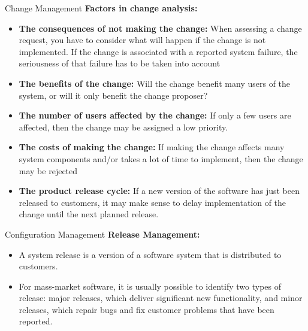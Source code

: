 \documentclass{beamer}
\begin{document}
\begin{frame}{Change Management}
	\textbf{Factors in change analysis:}
	\begin{itemize}
		\item \textbf{The consequences of not making the change:} When assessing a change request, you have to consider 
		what will happen if the change is not implemented. If the change is associated with a reported system 
		failure, the seriousness of that failure has to be taken into account
		\item \textbf{The benefits of the change:} Will the change benefit many users of the system, or will it only benefit the 
		change proposer?
		\item \textbf{The number of users affected by the change:} If only a few users are affected, then the change may be 
		assigned a low priority.
		\item \textbf{The costs of making the change:} If making the change affects many system components and/or takes a 
		lot of time to implement, then the change may be rejected
		\item \textbf{The product release cycle:} If a new version of the software has just been released to customers, it may 
		make sense to delay implementation of the change until the next planned release.

	\end{itemize}
\end{frame}
\begin{frame}{Configuration Management}
	\textbf{Release Management:}
	\begin{itemize}
		\item A system release is a version of a software system that is distributed to customers.
		\item  For mass-market 
		software, it is usually possible to identify two types of release: major releases, which deliver significant 
		new functionality, and minor releases, which repair bugs and fix customer problems that have been 
		reported.
	\end{itemize}
\end{frame}
\end{document}
